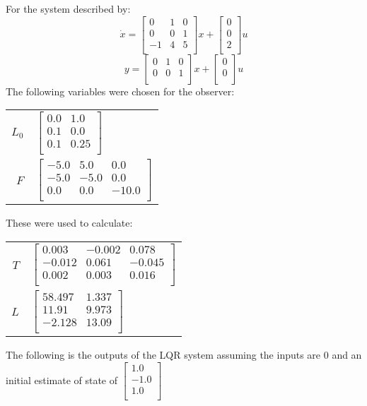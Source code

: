 For the system described by: 
\begin{equation}
\dot x = \begin{bmatrix}
0&1&0\\
0&0&1\\
-1&4&5\\
\end{bmatrix}
x + \begin{bmatrix}
0\\
0\\
2\\
\end{bmatrix}
u
\end{equation}
\begin{equation}
y = \begin{bmatrix}
0&1&0\\
0&0&1\\
\end{bmatrix}
x + \begin{bmatrix}
0\\
0\\
\end{bmatrix}
u
\end{equation}
The following variables were chosen for the observer:

\begin{tabular}{r|l}
$L_0$ & $\begin{bmatrix}
0.0&1.0\\
0.1&0.0\\
0.1&0.25\\
\end{bmatrix}
$\\
$F$ & $\begin{bmatrix}
-5.0&5.0&0.0\\
-5.0&-5.0&0.0\\
0.0&0.0&-10.0\\
\end{bmatrix}
$\\
\end{tabular}

These were used to calculate: 

\begin{tabular}{r|l}
$T$ & $\begin{bmatrix}
0.003&-0.002&0.078\\
-0.012&0.061&-0.045\\
0.002&0.003&0.016\\
\end{bmatrix}
$\\
$L$ & $\begin{bmatrix}
58.497&1.337\\
11.91&9.973\\
-2.128&13.09\\
\end{bmatrix}
$\\
\end{tabular}

The following is the outputs of the LQR system assuming the inputs are 0 and an initial estimate of state of $\begin{bmatrix}
1.0\\
-1.0\\
1.0\\
\end{bmatrix}
$

